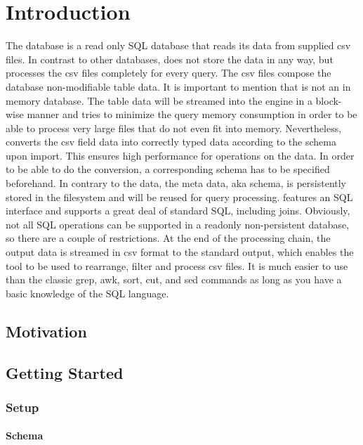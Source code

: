 
\chapter{Introduction}

The \csvsqldb{} database is a read only SQL database that reads its data from supplied csv files. In contrast to other databases, \csvsqldb{} does not store the data in any way, but processes the csv files completely for every query. The csv files compose the database non-modifiable table data. It is important to mention that \csvsqldb{} is not an in memory database. The table data will be streamed into the engine in a block-wise manner and \csvsqldb{} tries to minimize the query memory consumption in order to be able to process very large files that do not even fit into memory. Nevertheless, \csvsqldb{} converts the csv field data into correctly typed data according to the schema upon import. This ensures high performance for operations on the data. In order to be able to do the conversion, a corresponding schema has to be specified beforehand. In contrary to the data, the meta data, aka schema, is persistently stored in the filesystem and will be reused for query processing. \csvsqldb{} features an SQL interface and supports a great deal of standard SQL, including joins. Obviously, not all SQL operations can be supported in a readonly non-persistent database, so there are a couple of restrictions. At the end of the processing chain, the output data is streamed in csv format to the standard output, which enables the tool to be used to rearrange, filter and process csv files. It is much easier to use than the classic grep, awk, sort, cut, and sed commands as long as you have a basic knowledge of the SQL language.

\section{Motivation}

\section{Getting Started}

\subsection{Setup}

\subsubsection{Schema}

